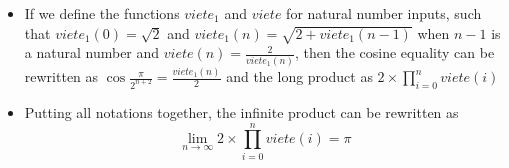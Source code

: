 \documentclass{article}
\begin{document}
\begin{itemize}
we have \(lim_{n \rightarrow \infty} \frac{\pi}{2 ^ {n}} = 0\), we can deduce
that \[\lim_{n \rightarrow \infty} 2 ^ {n + 1} \sin \frac{\pi}{2 ^ {n + 1}} = \pi\]
\item If we define the functions \(viete_1\) and \(viete\) for natural number
inputs, such that
\(viete_1 (0) = \sqrt 2\) and \(viete_1 (n) = \sqrt{2 + viete_1 (n - 1)}\) when
\(n - 1\) is a natural number and
\(viete (n) = \frac{2}{viete_1(n)}\), then the cosine equality can be rewritten
as \(\cos \frac{\pi}{2 ^ {n + 2}} = \frac{viete_1(n)}{2}\) and the long product as
\(2 \times \prod_{i = 0}^n viete(i)\)
\item Putting all notations together, the infinite product can be rewritten as
\[\lim_{n \rightarrow \infty} 2 \times \prod_{i = 0}^n viete(i) = \pi\]
\end{itemize}
\end{document}
